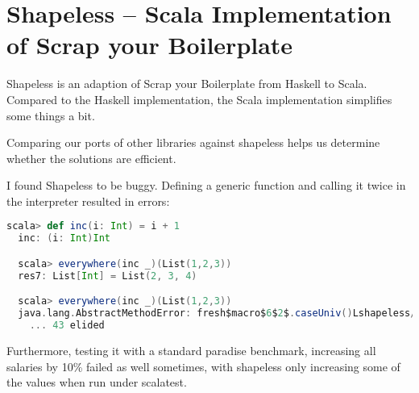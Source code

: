 \section{Shapeless -- Scala Implementation of Scrap your Boilerplate}

Shapeless is an adaption of Scrap your Boilerplate\cite{DBLP:conf/tldi/LammelJ03}
from Haskell to Scala. Compared to the Haskell implementation, the Scala
implementation simplifies some things a bit.

Comparing our ports of other libraries against shapeless helps us determine
whether the solutions are efficient.

I found Shapeless to be buggy. Defining a generic function and calling
it twice in the interpreter resulted in errors:
\begin{lstlisting}[language=Scala,gobble=2]
  scala> def inc(i: Int) = i + 1
  inc: (i: Int)Int

  scala> everywhere(inc _)(List(1,2,3))
  res7: List[Int] = List(2, 3, 4)

  scala> everywhere(inc _)(List(1,2,3))
  java.lang.AbstractMethodError: fresh$macro$6$2$.caseUniv()Lshapeless/PolyDefns$Case;
    ... 43 elided
\end{lstlisting}

Furthermore, testing it with a standard paradise benchmark, increasing all
salaries by 10\% failed as well sometimes, with shapeless only increasing
some of the values when run under scalatest.
